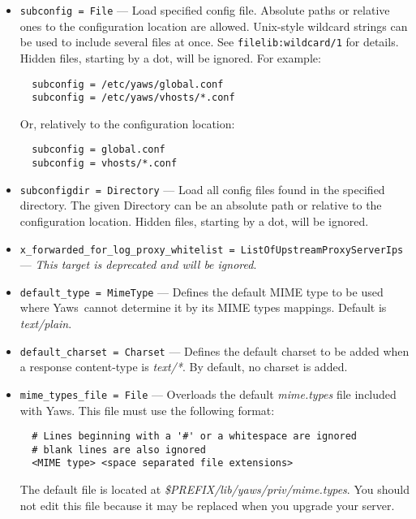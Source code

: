 \documentclass[11pt,oneside,english]{book}
\newcommand{\Yaws}            %
        {{\sc Yaws}}
\begin{document}
\begin{itemize}
\item        \verb+subconfig = File+ ---
              Load specified config file.  Absolute paths or relative ones to
              the configuration location are allowed. Unix-style wildcard
              strings can be used to include several files at once. See
              \verb+filelib:wildcard/1+ for details. Hidden files, starting by a
              dot, will be ignored. For example:

\begin{verbatim}
  subconfig = /etc/yaws/global.conf
  subconfig = /etc/yaws/vhosts/*.conf
\end{verbatim}

               Or, relatively to the configuration location:

\begin{verbatim}
  subconfig = global.conf
  subconfig = vhosts/*.conf
\end{verbatim}

\item        \verb+subconfigdir = Directory+ ---
              Load all config files found in the specified directory. The given
              Directory can be an absolute path or relative to the configuration
              location. Hidden files, starting by a dot, will be ignored.

\item        \verb+x_forwarded_for_log_proxy_whitelist = ListOfUpstreamProxyServerIps+ ---
              \textit{This target is deprecated and will be ignored}.

\item        \verb+default_type = MimeType+ ---
              Defines the default MIME type to be used where \Yaws\ cannot
              determine it by its MIME types mappings. Default is
              \textit{text/plain}.

\item        \verb+default_charset = Charset+ ---
              Defines the default charset to be added when a response
              content-type is \textit{text/*}. By default, no charset is added.

\item        \verb+mime_types_file = File+ ---
              Overloads the default \textit{mime.types} file included with
              \Yaws{}. This file must use the following format:
\begin{verbatim}
  # Lines beginning with a '#' or a whitespace are ignored
  # blank lines are also ignored
  <MIME type> <space separated file extensions>
\end{verbatim}
              The default file is located at
              \textit{\${PREFIX}/lib/yaws/priv/mime.types}. You should not edit
              this file because it may be replaced when you upgrade your server.


\end{itemize}
\end{document}
